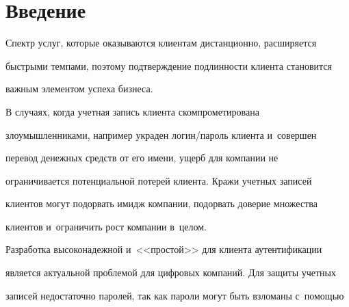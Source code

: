 \vspace*{-10pt}
















      \thispagestyle{headings}


      


      





\section{Введение}





\vspace*{-2pt}





  Спектр услуг, которые оказываются клиентам дистанционно, расширяется 


быстрыми темпами, поэтому подтверждение подлинности клиента становится 


важным элементом успеха бизнеса. 


  


  В случаях, когда учетная запись клиента скомпрометирована 


злоумышленниками, например украден логин\!/\!пароль клиента и~совершен 


перевод денежных средств от его имени, ущерб для компании не 


ограничивается потенциальной потерей клиента. Кражи учетных записей 


клиентов могут подорвать имидж компании, подорвать доверие множества 


клиентов и~ограничить рост компании в~целом.


  


  Разработка высоконадежной и~<<простой>> для клиента аутентификации 


является актуальной проблемой для цифровых компаний. Для защиты учетных 


записей недостаточно паролей, так как пароли могут быть взломаны с~помощью 


